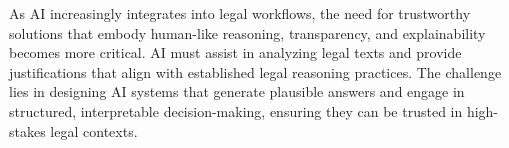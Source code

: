 As AI increasingly integrates into legal workflows, the need for trustworthy solutions that embody human-like reasoning, transparency, and explainability becomes more critical. AI must assist in analyzing legal texts and provide justifications that align with established legal reasoning practices. The challenge lies in designing AI systems that generate plausible answers and engage in structured, interpretable decision-making, ensuring they can be trusted in high-stakes legal contexts.






